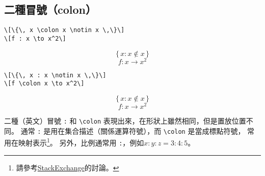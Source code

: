 \subsection{二種冒號（colon）}

\begin{Wrong}
\begin{verbatim}
\[\{\, x \colon x \notin x \,\}\]
\[f : x \to x^2\]
\end{verbatim}
\[\{\, x \colon x \notin x \,\}\]
\[f : x \to x^2\]
\end{Wrong}

\begin{Right}
\begin{verbatim}
\[\{\, x : x \notin x \,\}\]
\[f \colon x \to x^2\]
\end{verbatim}
\[\{\, x : x \notin x \,\}\]
\[f \colon x \to x^2\]
\end{Right}

二種（英文）冒號 \verb|:| 和 \verb|\colon| 表現出來，在形狀上雖然相同，但是置放位置不同。
通常 \verb|:| 是用在集合描述（關係運算符號），而 \verb|\colon| 是當成標點符號，
常用在映射表示\footnote{請參考\href{https://tex.stackexchange.com/questions/37789/using-colon-or-in-formulas}{\sf StackExchange}的討論。}。
另外，比例通常用 \verb|:|，例如$x:y:z = 3:4:5$。

\marginpar{\back}
